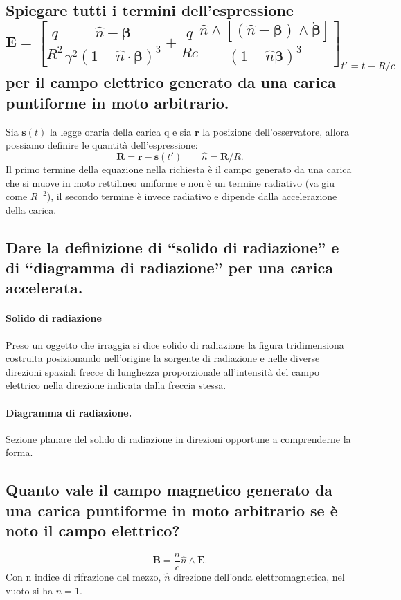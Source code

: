 \subsection[]{Spiegare tutti i termini dell’espressione 
\label{sec:3.a.11}
	\[
	\boldsymbol{E} = \left[ \frac{q}{R^2}\frac{\hat{n}- \boldsymbol{\beta}}{\gamma^2 \left( 1 - \hat{n} \cdot \boldsymbol{\beta} \right)^3 } + \frac{q}{Rc} \frac{\hat{n} \wedge \left[ \left( \hat{n} -\boldsymbol{\beta}  \right) \wedge \dot{\boldsymbol{\beta}} \right] }{\left( 1 - \hat{n} \boldsymbol{\beta}\right)^3 } \right]_{t' = t - R/c}  
\] 
per il campo elettrico generato da una carica puntiforme in moto arbitrario.}
Sia $\boldsymbol{s}\left( t \right) $ la legge oraria della carica q e sia $\boldsymbol{r}$ la posizione dell'osservatore, allora possiamo definire le quantità dell'espressione:
\[
	\boldsymbol{R}=\boldsymbol{r}-\boldsymbol{s}\left( t' \right) \quad \quad \hat{n}=\boldsymbol{R}/R
.\] 
Il primo termine della equazione nella richiesta è il campo generato da una carica che si muove in moto rettilineo uniforme e non è un termine radiativo (va giu come $R^{-2}$), il secondo termine è invece radiativo e dipende dalla accelerazione della carica.
\subsection[]{Dare la definizione di “solido di radiazione” e di “diagramma di radiazione” per una carica accelerata.}
\label{sec:3.a.12}
\paragraph{Solido di radiazione}
\label{par:Solido di radiazione.}
Preso un oggetto che irraggia si dice solido di radiazione la figura tridimensiona costruita posizionando nell'origine la sorgente di radiazione e nelle diverse direzioni spaziali frecce di lunghezza proporzionale all'intensità del campo elettrico nella direzione indicata dalla freccia stessa.

\paragraph{Diagramma di radiazione.}%
\label{par:Diagramma di radiazione.}
Sezione planare del solido di radiazione in direzioni opportune a comprenderne la forma. 

\subsection[]{Quanto vale il campo magnetico generato da una carica puntiforme in moto arbitrario se è noto il campo elettrico?}
\label{sec:3.a.13}
\[
	\boldsymbol{B}= \frac{n}{c} \hat{n} \wedge \boldsymbol{E} 	
.\] 
Con n indice di rifrazione del mezzo, $\hat{n}$ direzione dell'onda elettromagnetica, nel vuoto si ha $n=1$.
